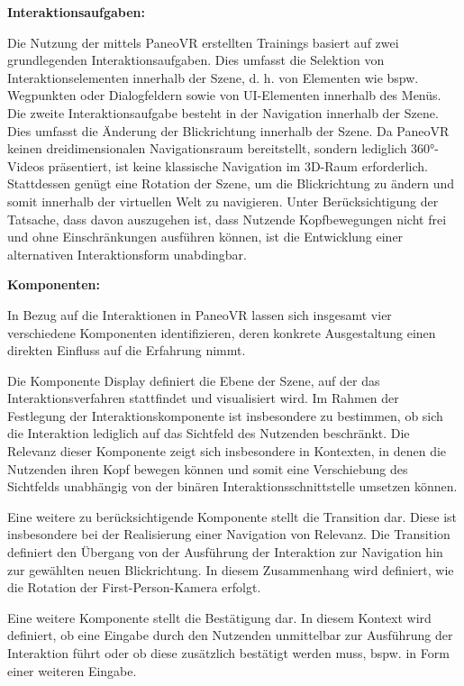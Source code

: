 {\normalfont \bfseries Interaktionsaufgaben:}  

Die Nutzung der mittels PaneoVR erstellten Trainings basiert auf zwei grundlegenden Interaktionsaufgaben. Dies umfasst die Selektion von Interaktionselementen innerhalb der Szene, d. h. von Elementen wie bspw. Wegpunkten oder Dialogfeldern sowie von UI-Elementen innerhalb des Menüs. Die zweite Interaktionsaufgabe besteht in der Navigation innerhalb der Szene. Dies umfasst die Änderung der Blickrichtung innerhalb der Szene. Da PaneoVR keinen dreidimensionalen Navigationsraum bereitstellt, sondern lediglich 360°-Videos präsentiert, ist keine klassische Navigation im 3D-Raum erforderlich. Stattdessen genügt eine Rotation der Szene, um die Blickrichtung zu ändern und somit innerhalb der virtuellen Welt zu navigieren. Unter Berücksichtigung der Tatsache, dass davon auszugehen ist, dass Nutzende Kopfbewegungen nicht frei und ohne Einschränkungen ausführen können, ist die Entwicklung einer alternativen Interaktionsform unabdingbar. 

{\normalfont \bfseries Komponenten:} 

In Bezug auf die Interaktionen in PaneoVR lassen sich insgesamt vier verschiedene Komponenten identifizieren, deren konkrete Ausgestaltung einen direkten Einfluss auf die Erfahrung nimmt. 

Die Komponente Display definiert die Ebene der Szene, auf der das Interaktionsverfahren stattfindet und visualisiert wird. Im Rahmen der Festlegung der Interaktionskomponente ist insbesondere zu bestimmen, ob sich die Interaktion lediglich auf das Sichtfeld des Nutzenden beschränkt. Die Relevanz dieser Komponente zeigt sich insbesondere in Kontexten, in denen die Nutzenden ihren Kopf bewegen können und somit eine Verschiebung des Sichtfelds unabhängig von der binären Interaktionsschnittstelle umsetzen können. 

Eine weitere zu berücksichtigende Komponente stellt die Transition dar. Diese ist insbesondere bei der Realisierung einer Navigation von Relevanz. Die Transition definiert den Übergang von der Ausführung der Interaktion zur Navigation hin zur gewählten neuen Blickrichtung. In diesem Zusammenhang wird definiert, wie die Rotation der First-Person-Kamera erfolgt. 

Eine weitere Komponente stellt die Bestätigung dar. In diesem Kontext wird definiert, ob eine Eingabe durch den Nutzenden unmittelbar zur Ausführung der Interaktion führt oder ob diese zusätzlich bestätigt werden muss, bspw. in Form einer weiteren Eingabe.

